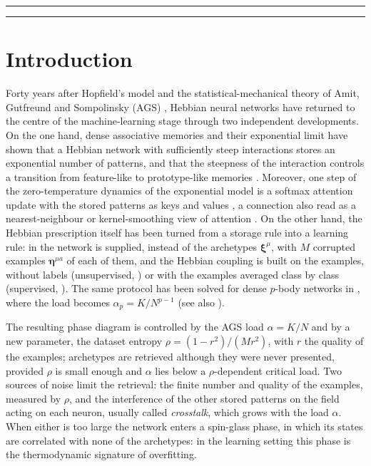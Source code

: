 \documentclass{SciPost}
\theoremstyle{plain}
\theoremstyle{definition}
\newcommand{\x}{\bm{\xi}}
\newcommand{\e}{\bm{\eta}}
\begin{document}
\linenumbers

\vspace{2pt}
\noindent\rule{\textwidth}{1pt}
{\setlength{\cftbeforesecskip}{5pt}\tableofcontents}
\noindent\rule{\textwidth}{1pt}
\vspace{10pt}

\section{Introduction}

Forty years after Hopfield's model \cite{Hopfield1982} and the statistical-mechanical theory of Amit, Gutfreund and Sompolinsky (AGS) \cite{AGS1985,AGS1987}, Hebbian neural networks have returned to the centre of the machine-learning stage through two independent developments. On the one hand, dense associative memories \cite{Krotov2016,Krotov2018,Demircigil2017} and their exponential limit \cite{Ramsauer2021,Lucibello2024,Albanese2025exp} have shown that a Hebbian network with sufficiently steep interactions stores an exponential number of patterns, and that the steepness of the interaction controls a transition from feature-like to prototype-like memories \cite{Krotov2016}. Moreover, one step of the zero-temperature dynamics of the exponential model is a softmax attention update with the stored patterns as keys and values \cite{Ramsauer2021,Hoover2024}, a connection also read as a nearest-neighbour or kernel-smoothing view of attention \cite{Tsai2019,Bricken2021,Millidge2022}. On the other hand, the Hebbian prescription itself has been turned from a storage rule into a learning rule: in \cite{Agliari2022concept,Alemanno2023} the network is supplied, instead of the archetypes $\x^\mu$, with $M$ corrupted examples $\e^{\mu a}$ of each of them, and the Hebbian coupling is built on the examples, without labels (unsupervised, \cite{Agliari2022concept}) or with the examples averaged class by class (supervised, \cite{Alemanno2023}). The same protocol has been solved for dense $p$-body networks in \cite{Agliari2023sup,Agliari2023unsup}, where the load becomes $\alpha_p=K/N^{p-1}$ (see also \cite{Albanese2024first,Agliari2024dreaming,Fontanari1990}).

The resulting phase diagram is controlled by the AGS load $\alpha=K/N$ and by a new parameter, the dataset entropy $\rho=(1-r^2)/(Mr^2)$, with $r$ the quality of the examples; archetypes are retrieved although they were never presented, provided $\rho$ is small enough and $\alpha$ lies below a $\rho$-dependent critical load. Two sources of noise limit the retrieval: the finite number and quality of the examples, measured by $\rho$, and the interference of the other stored patterns on the field acting on each neuron, usually called \emph{crosstalk}, which grows with the load $\alpha$. When either is too large the network enters a spin-glass phase, in which its states are correlated with none of the archetypes: in the learning setting this phase is the thermodynamic signature of overfitting.
\end{document}

